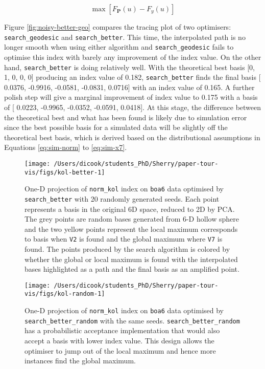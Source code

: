 \documentclass[12pt]{article}
\begin{document}
\[\max \left[F_{\mathbf{P}}(u) - F_{y}(u)\right]\]

Figure \ref{fig:noisy-better-geo} compares the tracing plot of two optimisers: \texttt{search\_geodesic} and \texttt{search\_better}. This time, the interpolated path is no longer smooth when using either algorithm and \texttt{search\_geodesic} fails to optimise this index with barely any improvement of the index value. On the other hand, \texttt{search\_better} is doing relatively well. With the theoretical best basis {[}0, 1, 0, 0, 0{]} producing an index value of 0.182, \texttt{search\_better} finds the final basis {[} 0.0376, -0.9916, -0.0581, -0.0831, 0.0716{]} with an index value of 0.165. A further polish step will give a marginal improvement of index value to 0.175 with a basis of {[} 0.0223, -0.9965, -0.0352, -0.0591, 0.0418{]}. At this stage, the difference between the theoretical best and what has been found is likely due to simulation error since the best possible basis for a simulated data will be slightly off the theoretical best basis, which is derived based on the distributional assumptions in Equations \ref{eq:sim-norm} to \ref{eq:sim-x7}.

\begin{figure}

{\centering \texttt{[image: /Users/dicook/students\_PhD/Sherry/paper-tour-vis/figs/kol-better-1]} 

}

\caption{One-D projection of \texttt{norm\_kol} index on \texttt{boa6} data optimised by \texttt{search\_better} with 20 randomly generated seeds. Each point represents a basis in the original 6D space, reduced to 2D by PCA. The grey points are random bases generated from 6-D hollow sphere and the two yellow points represent the local maximum corresponds to basis when \texttt{V2} is found and the global maximum where \texttt{V7} is found. The points produced by the search algorithm is colored by whether the global or local maximum is found with the interpolated bases highlighted as a path and the final basis as an amplified point.}\label{fig:kol-better}
\end{figure}



\begin{figure}

{\centering \texttt{[image: /Users/dicook/students\_PhD/Sherry/paper-tour-vis/figs/kol-random-1]} 

}

\caption{One-D projection of \texttt{norm\_kol} index on \texttt{boa6} data optimised by \texttt{search\_better\_random} with the same seeds. \texttt{search\_better\_random} has a probabilistic acceptance implementation that would also accept a basis with lower index value. This design allows the optimiser to jump out of the local maximum and hence more instances find the global maximum.}\label{fig:kol-random}
\end{figure}
\end{document}
